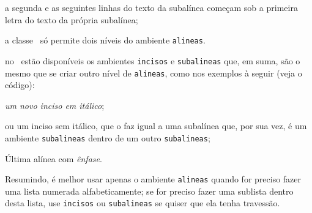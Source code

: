 \begin{alineas}
\begin{alineas}
     \item a segunda e as seguintes linhas do texto da subalínea começam sob a
     primeira letra do texto da própria subalínea;
     
     \item a classe \abnTeX\ só permite dois níveis do ambiente 
     \texttt{alineas}. 
     
%     

  \end{alineas}
  
  \item no \abnTeX\ estão disponíveis os ambientes \texttt{incisos} e
  \texttt{subalineas} que, em suma, são o mesmo que se criar outro nível de
  \texttt{alineas}, como nos exemplos à seguir (veja o código):
  
  \begin{incisos}
    \item \textit{um novo inciso em itálico};
    \item ou um inciso sem itálico, que o faz igual a uma subalínea que,
    por sua vez, é um ambiente \texttt{subalineas} dentro de um outro
    \texttt{subalineas};
  \end{incisos}
    
  \item Última alínea com \emph{ênfase}.
  
\end{alineas}

Resumindo, é melhor usar apenas o ambiente \texttt{alineas} quando for
preciso fazer uma lista numerada alfabeticamente; se for preciso fazer
uma sublista dentro desta lista, use \texttt{incisos} ou \texttt{subalineas}
se quiser que ela tenha travessão.

